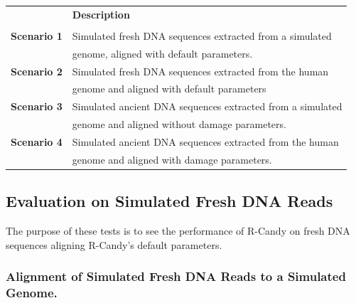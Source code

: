 \documentclass[11pt,a4paper]{report}
\begin{document}
\begin{table}[H]
  \begin{tabular}{ | c| l |}
    \hline
 		                           &  \textbf{Description} \\\\ \hline
       \textbf{  Scenario 1 }  &  Simulated fresh DNA sequences extracted from a simulated \\
                               &  genome, aligned with default parameters. \\ \hline
       \textbf{  Scenario 2 }  &  Simulated fresh DNA sequences extracted from the human \\
                               &  genome and aligned with default parameters \\  \hline
       \textbf{  Scenario 3 }  &  Simulated ancient DNA sequences extracted from a simulated \\
                               &  genome and aligned without damage parameters. \\  \hline
       \textbf{  Scenario 4 }  &  Simulated ancient DNA sequences extracted from the human \\
                               &   genome and aligned with damage parameters. \\  \hline
       
    \end{tabular}
\label{test-scenarios}
\end{table}




\subsection{Evaluation on Simulated Fresh DNA Reads } \label{Simulated Fresh DNA Reads }
 
 The purpose of these tests is to see the performance of R-Candy on 
 fresh DNA sequences aligning R-Candy's default parameters. 

 \subsubsection {Alignment of Simulated Fresh DNA Reads to a Simulated Genome.}
 \label {Alignment of Simulated Fresh DNA Reads to a Simulated Genome.}
 
\end{document}
